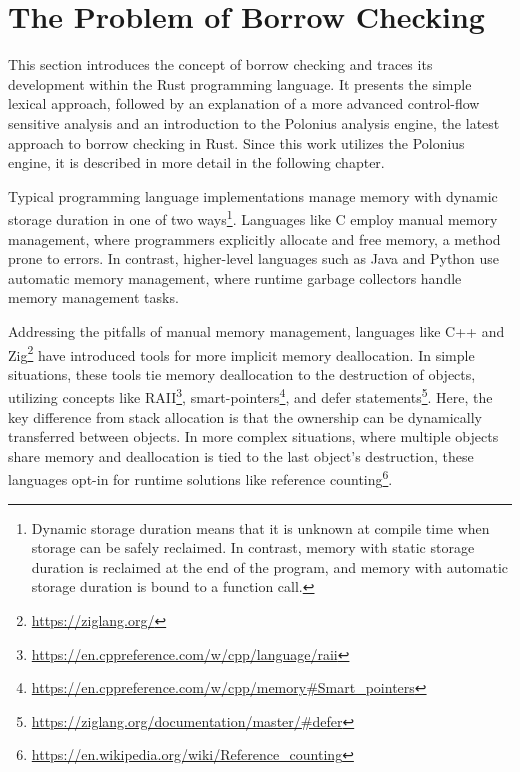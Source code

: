 \documentclass[
  11pt,
  twoside,symmetric]{report}
\DeclareRobustCommand{\href}[2]{#2\footnote{\url{#1}}}
\begin{document}
\chapter{The Problem of Borrow
Checking}\label{sec:the-problem-of-borrow-checking}

This section introduces the concept of borrow checking and traces its
development within the Rust programming language. It presents the simple
lexical approach, followed by an explanation of a more advanced
control-flow sensitive analysis and an introduction to the Polonius
analysis engine, the latest approach to borrow checking in Rust. Since
this work utilizes the Polonius engine, it is described in more detail
in the following chapter.

Typical programming language implementations manage memory with dynamic
storage duration in one of two ways\footnote{Dynamic storage duration
  means that it is unknown at compile time when storage can be safely
  reclaimed. In contrast, memory with static storage duration is
  reclaimed at the end of the program, and memory with automatic storage
  duration is bound to a function call.}. Languages like C employ manual
memory management, where programmers explicitly allocate and free
memory, a method prone to errors. In
contrast, higher-level languages such as Java and Python use automatic
memory management, where runtime garbage collectors handle memory
management tasks.

Addressing the pitfalls of manual memory management, languages like C++
and \href{https://ziglang.org/}{Zig} have introduced tools for more
implicit memory deallocation. In simple situations, these tools tie
memory deallocation to the destruction of objects, utilizing concepts
like \href{https://en.cppreference.com/w/cpp/language/raii}{RAII},
\href{https://en.cppreference.com/w/cpp/memory\#Smart_pointers}{smart-pointers},
and \href{https://ziglang.org/documentation/master/\#defer}{defer
statements}. Here, the key difference from stack allocation is that the
ownership can be dynamically transferred between objects. In more
complex situations, where multiple objects share memory and deallocation
is tied to the last object's destruction, these languages opt-in for
runtime solutions like
\href{https://en.wikipedia.org/wiki/Reference_counting}{reference
counting}.
\end{document}
